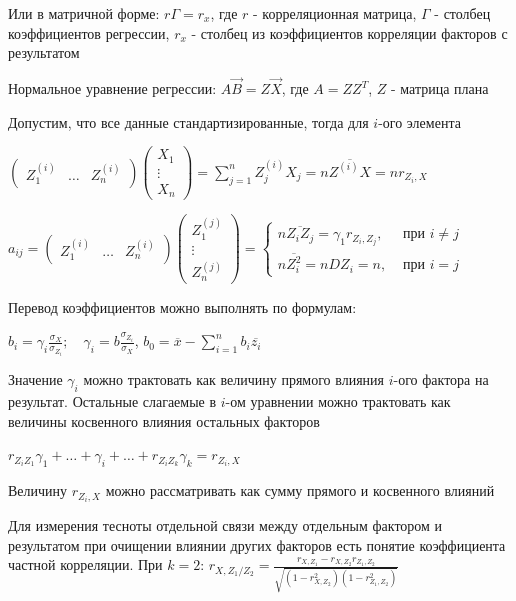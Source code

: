 \begin{enumerate}
    \smallvspace

    Или в матричной форме: $r \Gamma = r_x$, где $r$ - корреляционная матрица, $\Gamma$ - столбец коэффициентов регрессии, $r_x$ - столбец из коэффициентов корреляции факторов с результатом

    Нормальное уравнение регрессии: $A \vec B = Z \vec X$, где $A = Z Z^T$, $Z$ - матрица плана

    Допустим, что все данные стандартизированные, тогда для $i$-ого элемента

    $\begin{pmatrix}Z_1^{(i)} & \dots & Z_n^{(i)}\end{pmatrix} \begin{pmatrix}X_1 \\ \vdots \\ X_n\end{pmatrix} = 
    \sum_{j = 1}^n Z^{(i)}_j X_j = n \overline{Z^{(i)} X} = n r_{Z_i, X}$

    $a_{ij} = \begin{pmatrix}Z_1^{(i)} & \dots & Z_n^{(i)}\end{pmatrix} \begin{pmatrix}Z_1^{(j)} \\ \vdots \\ Z_n^{(j)}\end{pmatrix} = 
    \begin{cases}
        n \overline{Z_i Z_j} = \gamma_1 r_{Z_i, Z_j}, & \text{ при } i \neq j \\
        n \overline{Z_i^2} = n D Z_i = n, & \text{ при } i = j
    \end{cases}$

    Перевод коэффициентов можно выполнять по формулам:

    $b_i = \gamma_i \frac{\sigma_X}{\sigma_{Z_i}}; \quad \gamma_i = b \frac{\sigma_{Z_i}}{\sigma_X}$, $b_0 = \overline{x} - \sum_{i = 1}^n b_i \overline{z_i}$

    Значение $\gamma_i$ можно трактовать как величину прямого влияния $i$-ого фактора на результат. Остальные слагаемые в $i$-ом уравнении можно трактовать
    как величины косвенного влияния остальных факторов 

    $r_{Z_i Z_1} \gamma_1 + \dots + \gamma_i + \dots + r_{Z_i Z_k} \gamma_k = r_{Z_i, X}$

    Величину $r_{Z_i, X}$ можно рассматривать как сумму прямого и косвенного влияний

    \Nota Для измерения тесноты отдельной связи между отдельным фактором и результатом при очищении влиянии других факторов
    есть понятие коэффициента частной корреляции. При $k = 2$: $r_{X, Z_1 / Z_2} = \frac{r_{X, Z_1} - r_{X, Z_2} r_{Z_1, Z_2}}{\sqrt{(1 - r_{X, Z_2}^2)(1 - r_{Z_1, Z_2}^2)}}$


\end{enumerate}
